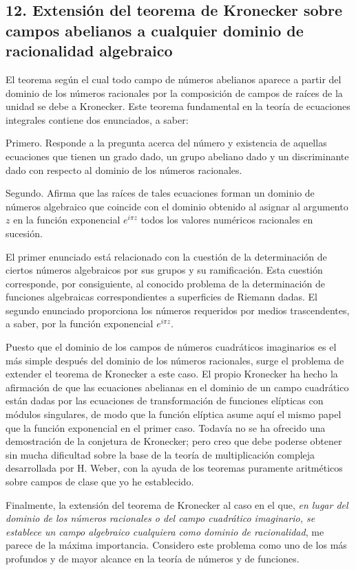 \documentclass[a4paper, 12pt]{article}
\begin{document}
\subsection*{12. Extensión del teorema de Kronecker sobre campos abelianos
a cualquier dominio de racionalidad algebraico}

El teorema según el cual todo campo de números abelianos aparece a partir del dominio de los números racionales por la composición de campos de raíces de la unidad se debe a Kronecker. Este teorema fundamental en la teoría de ecuaciones integrales contiene dos enunciados, a saber:

Primero. Responde a la pregunta acerca del número y existencia de aquellas ecuaciones que tienen un grado dado, un grupo abeliano dado y un discriminante dado con respecto al dominio de los números racionales.

Segundo. Afirma que las raíces de tales ecuaciones forman un dominio de números algebraico que coincide con el dominio obtenido al asignar al argumento $z$ en la función exponencial $e^{i \pi z}$ todos los valores numéricos racionales en sucesión.

El primer enunciado está relacionado con la cuestión de la determinación de ciertos números algebraicos por sus grupos y su ramificación. Esta cuestión corresponde, por consiguiente, al conocido problema de la determinación de funciones algebraicas correspondientes a superficies de Riemann dadas. El segundo enunciado proporciona los números requeridos por medios trascendentes, a saber, por la función exponencial $e^{i\pi z}$.

Puesto que el dominio de los campos de números cuadráticos imaginarios es el más simple después del dominio de los números racionales, surge el problema de extender el teorema de Kronecker a este caso. El propio Kronecker ha hecho la afirmación de que las ecuaciones abelianas en el dominio de un campo cuadrático están dadas por las ecuaciones de transformación de funciones elípticas con módulos singulares, de modo que la función elíptica asume aquí el mismo papel que la función exponencial en el primer caso. Todavía no se ha ofrecido una demostración de la conjetura de Kronecker; pero creo que debe poderse obtener sin mucha dificultad sobre la base de la teoría de multiplicación compleja desarrollada por H. Weber, con la ayuda de los teoremas puramente aritméticos sobre campos de clase que yo he establecido.


Finalmente, la extensión del teorema de Kronecker al caso en el que, \textit{en lugar del dominio de los números racionales o del campo cuadrático imaginario, se establece un campo algebraico cualquiera como dominio de racionalidad}, me parece de la máxima importancia. Considero este problema como uno de los más profundos y de mayor alcance en la teoría de números y de funciones.
\end{document}
